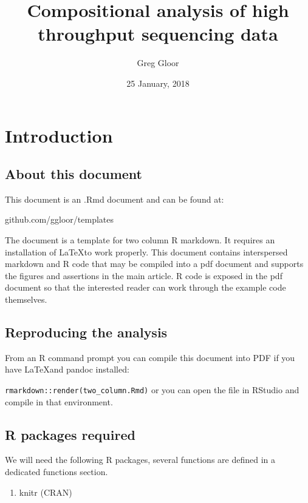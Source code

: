 \documentclass[twocolumn]{article}
\title{Compositional analysis of high throughput sequencing data}
\author{Greg Gloor}
\date{25 January, 2018}
\providecommand{\tightlist}{%
  \setlength{\itemsep}{0pt}\setlength{\parskip}{0pt}}
\begin{document}
\maketitle

{
\hypersetup{linkcolor=black}
\setcounter{tocdepth}{3}
\tableofcontents
}
\clearpage

\section{Introduction}\label{introduction}

\subsection{About this document}\label{about-this-document}

This document is an .Rmd document and can be found at:

github.com/ggloor/templates

The document is a template for two column R markdown. It requires an
installation of \LaTeX to work properly. This document contains
interspersed markdown and R code that may be compiled into a pdf
document and supports the figures and assertions in the main article. R
code is exposed in the pdf document so that the interested reader can
work through the example code themselves.

\subsection{Reproducing the analysis}\label{reproducing-the-analysis}

From an R command prompt you can compile this document into PDF if you
have \LaTeX and pandoc installed:

\texttt{rmarkdown::render(\textquotesingle{}two\_column.Rmd\textquotesingle{})}
or you can open the file in RStudio and compile in that environment.

\subsection{R packages required}\label{r-packages-required}

We will need the following R packages, several functions are defined in
a dedicated functions section.

\begin{enumerate}
\def\labelenumi{\arabic{enumi}.}
\tightlist
\item
  knitr (CRAN)
\end{enumerate}
\end{document}
